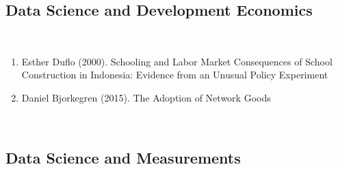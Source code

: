 \subsection{Data Science and Development Economics}  \\  
\begin{enumerate}  
\item  Esther Duflo (2000).  Schooling and Labor Market Consequences of School Construction in Indonesia: Evidence from an Unusual Policy Experiment \cite{Duflo_2000} 
\item Daniel Bjorkegren (2015).  The Adoption of Network Goods \cite{Bjorkegren} 
\end{enumerate}  
\\  
\subsection{Data Science and Measurements}  
